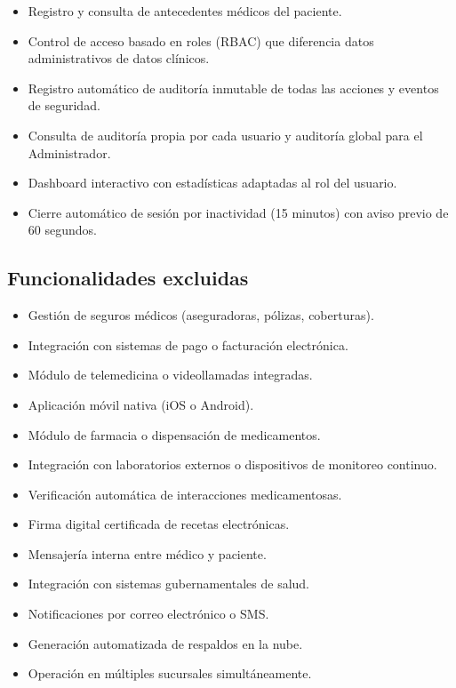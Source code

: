\documentclass[11pt,a4paper]{article}
\begin{document}
\begin{itemize}
    \item Registro y consulta de antecedentes médicos del paciente.
    \item Control de acceso basado en roles (RBAC) que diferencia datos administrativos de datos clínicos.
    \item Registro automático de auditoría inmutable de todas las acciones y eventos de seguridad.
    \item Consulta de auditoría propia por cada usuario y auditoría global para el Administrador.
    \item Dashboard interactivo con estadísticas adaptadas al rol del usuario.
    \item Cierre automático de sesión por inactividad (15 minutos) con aviso previo de 60 segundos.
\end{itemize}

\subsection{Funcionalidades excluidas}

\begin{itemize}
    \item Gestión de seguros médicos (aseguradoras, pólizas, coberturas).
    \item Integración con sistemas de pago o facturación electrónica.
    \item Módulo de telemedicina o videollamadas integradas.
    \item Aplicación móvil nativa (iOS o Android).
    \item Módulo de farmacia o dispensación de medicamentos.
    \item Integración con laboratorios externos o dispositivos de monitoreo continuo.
    \item Verificación automática de interacciones medicamentosas.
    \item Firma digital certificada de recetas electrónicas.
    \item Mensajería interna entre médico y paciente.
    \item Integración con sistemas gubernamentales de salud.
    \item Notificaciones por correo electrónico o SMS.
    \item Generación automatizada de respaldos en la nube.
    \item Operación en múltiples sucursales simultáneamente.
\end{itemize}
\end{document}
